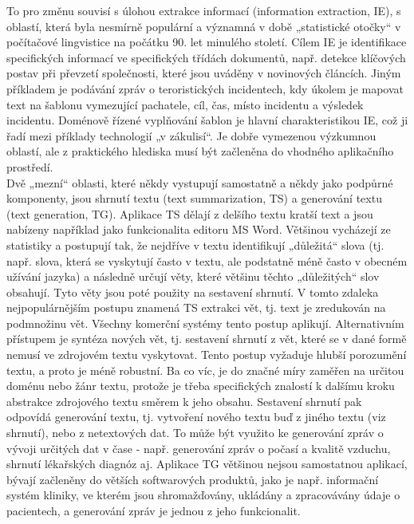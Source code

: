 \documentclass[]{../../metanetpaper}
\begin{document}
\begin{multicols}{2}
To pro změnu souvisí s úlohou extrakce informací (information extraction, IE), s oblastí, která byla nesmírně populární a významná v době „statistické otočky“ v počítačové lingvistice na počátku 90. let minulého století. Cílem IE je identifikace specifických informací ve specifických třídách dokumentů, např. detekce klíčových postav při převzetí společnosti, které jsou uváděny v novinových článcích. Jiným příkladem je podávání zpráv o teroristických incidentech, kdy úkolem je mapovat text na šablonu vymezující pachatele, cíl, čas, místo incidentu a výsledek incidentu. Doménově řízené vyplňování šablon je hlavní charakteristikou IE, což ji řadí mezi příklady technologií „v zákulisí“. Je dobře vymezenou výzkumnou oblastí, ale z praktického hlediska musí být začleněna do vhodného aplikačního prostředí.\\
Dvě „mezní“ oblasti, které někdy vystupují samostatně a někdy jako podpůrné komponenty, jsou shrnutí textu (text summarization, TS) a generování textu (text generation, TG). Aplikace TS dělají z delšího textu kratší text a jsou nabízeny například jako funkcionalita editoru MS Word. Většinou vycházejí ze statistiky a postupují tak, že nejdříve v textu identifikují „důležitá“ slova (tj. např. slova, která se vyskytují často v textu, ale podstatně méně často v obecném užívání jazyka) a následně určují věty, které většinu těchto „důležitých“ slov obsahují. Tyto věty jsou poté použity na sestavení shrnutí. V tomto zdaleka nejpopulárnějším postupu znamená TS extrakci vět, tj. text je zredukován na podmnožinu vět. Všechny komerční systémy tento postup aplikují.
Alternativním přístupem je syntéza nových vět, tj. sestavení shrnutí z vět, které se v dané formě nemusí ve zdrojovém textu vyskytovat. Tento postup vyžaduje hlubší porozumění textu, a proto je méně robustní. Ba co víc, je do značné míry zaměřen na určitou doménu nebo žánr textu, protože je třeba specifických znalostí k dalšímu kroku abstrakce zdrojového textu směrem k jeho obsahu. Sestavení shrnutí pak odpovídá generování textu, tj. vytvoření nového textu buď z jiného textu (viz shrnutí), nebo z netextových dat. To může být využito ke generování zpráv o vývoji určitých dat v čase - např. generování zpráv o počasí a kvalitě vzduchu, shrnutí lékařských diagnóz aj. Aplikace TG většinou nejsou samostatnou aplikací, bývají začleněny do větších softwarových produktů, jako je např. informační systém kliniky, ve kterém jsou shromažďovány, ukládány a zpracovávány údaje o pacientech, a generování zpráv je jednou z jeho funkcionalit.


\end{multicols}
\end{document}
